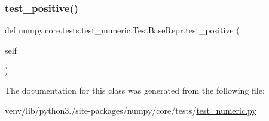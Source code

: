 \subsubsection{\texorpdfstring{test\+\_\+positive()}{test\_positive()}}
{\footnotesize\ttfamily def numpy.\+core.\+tests.\+test\+\_\+numeric.\+Test\+Base\+Repr.\+test\+\_\+positive (\begin{DoxyParamCaption}\item[{}]{self }\end{DoxyParamCaption})}



The documentation for this class was generated from the following file\+:\begin{DoxyCompactItemize}
\item 
venv/lib/python3./site-\/packages/numpy/core/tests/\hyperlink{core_2tests_2test__numeric_8py}{test\+\_\+numeric.\+py}\end{DoxyCompactItemize}

